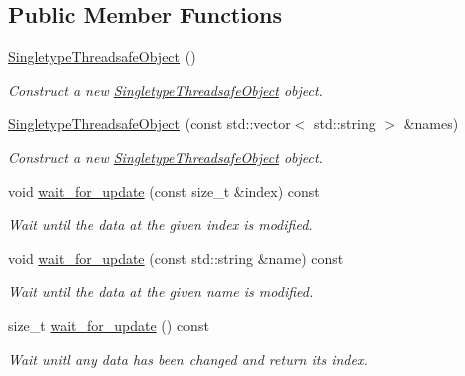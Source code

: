 \subsection*{Public Member Functions}
\begin{DoxyCompactItemize}
\item 
\hyperlink{classreal__time__tools_1_1SingletypeThreadsafeObject_a00771da99b515b82cd0b10a431b4ccb1}{Singletype\+Threadsafe\+Object} ()\hypertarget{classreal__time__tools_1_1SingletypeThreadsafeObject_a00771da99b515b82cd0b10a431b4ccb1}{}\label{classreal__time__tools_1_1SingletypeThreadsafeObject_a00771da99b515b82cd0b10a431b4ccb1}

\begin{DoxyCompactList}\small\item\em Construct a new \hyperlink{classreal__time__tools_1_1SingletypeThreadsafeObject}{Singletype\+Threadsafe\+Object} object. \end{DoxyCompactList}\item 
\hyperlink{classreal__time__tools_1_1SingletypeThreadsafeObject_ad33b8afc1581cc7adea5881c9d775128}{Singletype\+Threadsafe\+Object} (const std\+::vector$<$ std\+::string $>$ \&names)
\begin{DoxyCompactList}\small\item\em Construct a new \hyperlink{classreal__time__tools_1_1SingletypeThreadsafeObject}{Singletype\+Threadsafe\+Object} object. \end{DoxyCompactList}\item 
void \hyperlink{classreal__time__tools_1_1SingletypeThreadsafeObject_ace9ae42bea412eadcd251097089c30cc}{wait\+\_\+for\+\_\+update} (const size\+\_\+t \&index) const 
\begin{DoxyCompactList}\small\item\em Wait until the data at the given index is modified. \end{DoxyCompactList}\item 
void \hyperlink{classreal__time__tools_1_1SingletypeThreadsafeObject_a222e0fbdabcdccd95e9d66663e849a58}{wait\+\_\+for\+\_\+update} (const std\+::string \&name) const 
\begin{DoxyCompactList}\small\item\em Wait until the data at the given name is modified. \end{DoxyCompactList}\item 
size\+\_\+t \hyperlink{classreal__time__tools_1_1SingletypeThreadsafeObject_ad86f983aa4366695415ca3816002a3fd}{wait\+\_\+for\+\_\+update} () const 
\begin{DoxyCompactList}\small\item\em Wait unitl any data has been changed and return its index. \end{DoxyCompactList}\item 

\end{DoxyCompactItemize}
